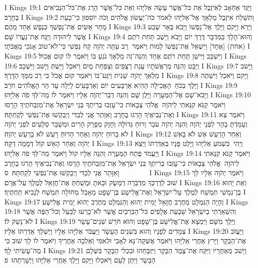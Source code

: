 I Kings 19:1	וַיַּגֵּד אַחְאָב לְאִיזֶבֶל אֵת כּל־אֲשֶׁר עָשָׂה אֵלִיָּהוּ וְאֵת כּל־אֲשֶׁר הָרַג אֶת־כּל־הַנְּבִיאִים בֶּחָרֶב׃
I Kings 19:2	וַתִּשְׁלַח אִיזֶבֶל מַלְאָךְ אֶל־אֵלִיָּהוּ לֵאמֹר כֹּה־יַעֲשׂוּן אֱלֹהִים וְכֹה יוֹסִפוּן כִּי־כָעֵת מָחָר אָשִׂים אֶת־נַפְשְׁךָ כְּנֶפֶשׁ אַחַד מֵהֶם׃
I Kings 19:3	וַיַּרְא וַיָּקם וַיֵּלֶךְ אֶל־נַפְשׁוֹ וַיָּבֹא בְּאֵר שֶׁבַע אֲשֶׁר לִיהוּדָה וַיַּנַּח אֶת־נַעֲרוֹ שָׁם׃
I Kings 19:4	וְהוּא־הָלַךְ בַּמִּדְבָּר דֶּרֶךְ יוֹם וַיָּבֹא וַיֵּשֶׁב תַּחַת רֹתֶם (אחת) [אֶחָד] וַיִּשְׁאַל אֶת־נַפְשׁוֹ לָמוּת וַיֹּאמֶר  רַב עַתָּה יְהֹוָה קַח נַפְשִׁי כִּי־לֹא־טוֹב אָנֹכִי מֵאֲבֹתָי׃
I Kings 19:5	וַיִּשְׁכַּב וַיִּישַׁן תַּחַת רֹתֶם אֶחָד וְהִנֵּה־זֶה מַלְאָךְ נֹגֵעַ בּוֹ וַיֹּאמֶר לוֹ קוּם אֱכוֹל׃
I Kings 19:6	וַיַּבֵּט וְהִנֵּה מְרַאֲשֹׁתָיו עֻגַת רְצָפִים וְצַפַּחַת מָיִם וַיֹּאכַל וַיֵּשְׁתְּ וַיָּשׁב וַיִּשְׁכָּב׃
I Kings 19:7	וַיָּשׁב מַלְאַךְ יְהֹוָה  שֵׁנִית וַיִּגַּע־בּוֹ וַיֹּאמֶר קוּם אֱכֹל כִּי רַב מִמְּךָ הַדָּרֶךְ׃
I Kings 19:8	וַיָּקם וַיֹּאכַל וַיִּשְׁתֶּה וַיֵּלֶךְ בְּכֹחַ  הָאֲכִילָה הַהִיא אַרְבָּעִים יוֹם וְאַרְבָּעִים לַיְלָה עַד הַר הָאֱלֹהִים חֹרֵב׃
I Kings 19:9	וַיָּבֹא־שָׁם אֶל־הַמְּעָרָה וַיָּלֶן שָׁם וְהִנֵּה דְבַר־יְהֹוָה אֵלָיו וַיֹּאמֶר לוֹ מַה־לְּךָ פֹה אֵלִיָּהוּ׃
I Kings 19:10	וַיֹּאמֶר קַנֹּא קִנֵּאתִי לַיהֹוָה  אֱלֹהֵי צְבָאוֹת כִּי־עָזְבוּ בְרִיתְךָ בְּנֵי יִשְׂרָאֵל אֶת־מִזְבְּחֹתֶיךָ הָרָסוּ וְאֶת־נְבִיאֶיךָ הָרְגוּ בֶחָרֶב וָאִוָּתֵר אֲנִי לְבַדִּי וַיְבַקְשׁוּ אֶת־נַפְשִׁי לְקַחְתָּהּ׃
I Kings 19:11	וַיֹּאמֶר צֵא וְעָמַדְתָּ בָהָר לִפְנֵי יְהֹוָה וְהִנֵּה יְהֹוָה עֹבֵר וְרוּחַ גְּדוֹלָה וְחָזָק מְפָרֵק הָרִים וּמְשַׁבֵּר סְלָעִים לִפְנֵי יְהֹוָה לֹא בָרוּחַ יְהֹוָה וְאַחַר הָרוּחַ רַעַשׁ לֹא בָרַעַשׁ יְהֹוָה׃
I Kings 19:12	וְאַחַר הָרַעַשׁ אֵשׁ לֹא בָאֵשׁ יְהֹוָה וְאַחַר הָאֵשׁ קוֹל דְּמָמָה דַקָּה׃
I Kings 19:13	וַיְהִי  כִּשְׁמֹעַ אֵלִיָּהוּ וַיָּלֶט פָּנָיו בְּאַדַּרְתּוֹ וַיֵּצֵא וַיַּעֲמֹד פֶּתַח הַמְּעָרָה וְהִנֵּה אֵלָיו קוֹל וַיֹּאמֶר מַה־לְּךָ פֹה אֵלִיָּהוּ׃
I Kings 19:14	וַיֹּאמֶר קַנֹּא קִנֵּאתִי לַיהֹוָה  אֱלֹהֵי צְבָאוֹת כִּי־עָזְבוּ בְרִיתְךָ בְּנֵי יִשְׂרָאֵל אֶת־מִזְבְּחֹתֶיךָ הָרָסוּ וְאֶת־נְבִיאֶיךָ הָרְגוּ בֶחָרֶב וָאִוָּתֵר אֲנִי לְבַדִּי וַיְבַקְשׁוּ אֶת־נַפְשִׁי לְקַחְתָּהּ׃ {ס}        
I Kings 19:15	וַיֹּאמֶר יְהֹוָה אֵלָיו לֵךְ שׁוּב לְדַרְכְּךָ מִדְבַּרָה דַמָּשֶׂק וּבָאתָ וּמָשַׁחְתָּ אֶת־חֲזָאֵל לְמֶלֶךְ עַל־אֲרָם׃
I Kings 19:16	וְאֵת יֵהוּא בֶן־נִמְשִׁי תִּמְשַׁח לְמֶלֶךְ עַל־יִשְׂרָאֵל וְאֶת־אֱלִישָׁע בֶּן־שָׁפָט מֵאָבֵל מְחוֹלָה תִּמְשַׁח לְנָבִיא תַּחְתֶּיךָ׃
I Kings 19:17	וְהָיָה הַנִּמְלָט מֵחֶרֶב חֲזָאֵל יָמִית יֵהוּא וְהַנִּמְלָט מֵחֶרֶב יֵהוּא יָמִית אֱלִישָׁע׃
I Kings 19:18	וְהִשְׁאַרְתִּי בְיִשְׂרָאֵל שִׁבְעַת אֲלָפִים כּל־הַבִּרְכַּיִם אֲשֶׁר לֹא־כָרְעוּ לַבַּעַל וְכל־הַפֶּה אֲשֶׁר לֹא־נָשַׁק לוֹ׃
I Kings 19:19	וַיֵּלֶךְ מִשָּׁם וַיִּמְצָא אֶת־אֱלִישָׁע בֶּן־שָׁפָט וְהוּא חֹרֵשׁ שְׁנֵים־עָשָׂר צְמָדִים לְפָנָיו וְהוּא בִּשְׁנֵים הֶעָשָׂר וַיַּעֲבֹר אֵלִיָּהוּ אֵלָיו וַיַּשְׁלֵךְ אַדַּרְתּוֹ אֵלָיו׃
I Kings 19:20	וַיַּעֲזֹב אֶת־הַבָּקָר וַיָּרץ אַחֲרֵי אֵלִיָּהוּ וַיֹּאמֶר אֶשְּׁקָה־נָּא לְאָבִי וּלְאִמִּי וְאֵלְכָה אַחֲרֶיךָ וַיֹּאמֶר לוֹ לֵךְ שׁוּב כִּי מֶה־עָשִׂיתִי לָךְ׃
I Kings 19:21	וַיָּשׁב מֵאַחֲרָיו וַיִּקַּח אֶת־צֶמֶד הַבָּקָר וַיִּזְבָּחֵהוּ וּבִכְלִי הַבָּקָר בִּשְּׁלָם הַבָּשָׂר וַיִּתֵּן לָעָם וַיֹּאכֵלוּ וַיָּקם וַיֵּלֶךְ אַחֲרֵי אֵלִיָּהוּ וַיְשָׁרְתֵהוּ׃ {פ}
